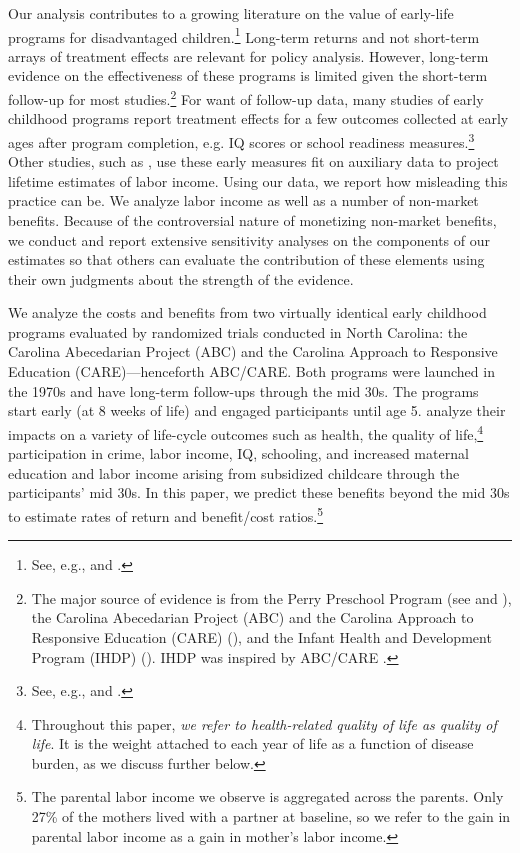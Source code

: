 Our analysis contributes to a growing literature on the value of early-life programs for disadvantaged children.\footnote{See, e.g., \cite{Currie_2011_AER} and \cite{Elango_Hojman_etal_2016_Early-Edu}.} Long-term returns and not short-term arrays of treatment effects are relevant for policy analysis. However, long-term evidence on the effectiveness of these programs is limited given the short-term follow-up for most studies.\footnote{The major source of evidence is from the Perry Preschool Program (see \citealp{Schweinhart_Montie_ea_2005_BOOKlifetime} and \citealp{Heckman_Moon_etal_2010_QE,Heckman_Moon_etal_2010_RateofReturn}), the Carolina Abecedarian Project (ABC) and the Carolina Approach to Responsive Education (CARE) (\citealp{Ramey_Campbell_etal_2000_ADS,Ramey-etal_2012-ABC}), and the Infant Health and Development Program (IHDP) (\citealp{Gross_Spiker_etal_1997_BOOKHelpinglowbirth,Duncan_Sojourner_2013_JHR}). IHDP was inspired by ABC/CARE \citep[][]{Gross_Spiker_etal_1997_BOOKHelpinglowbirth}.} For want of follow-up data, many studies of early childhood programs report treatment effects for a few outcomes collected at early ages after program completion, e.g. IQ scores or school readiness measures.\footnote{See, e.g.,  \cite{Weiland_2013_CD_Impacts-of-Pre-K} and \cite{Kline_Walters_2016_QJE}.} Other studies, such as \citet{Kline_Walters_2016_QJE}, use these early measures fit on auxiliary data to project lifetime estimates of labor income. Using our data, we report how misleading this practice can be. We analyze labor income as well as a number of non-market benefits. Because of the controversial nature of monetizing non-market benefits, we conduct and report extensive sensitivity analyses on the components of our estimates so that others can evaluate the contribution of these elements using their own judgments about the strength of the evidence.

We analyze the costs and benefits from two virtually identical early childhood programs evaluated by randomized trials conducted in North Carolina: the Carolina Abecedarian Project (ABC) and the Carolina Approach to Responsive Education (CARE)---henceforth ABC/CARE. Both programs were launched in the 1970s and have long-term follow-ups through the mid 30s. The programs start early (at 8 weeks of life) and engaged participants until age 5. \cite{Garcia_Heckman_Ziff_2017_Gender-Diff_UNPUBLISHED} analyze their impacts on a variety of life-cycle outcomes such as health, the quality of life,\footnote{Throughout this paper, \textit{we refer to health-related quality of life as quality of life}. It is the weight attached to each year of life as a function of disease burden, as we discuss further below.} participation in crime, labor income, IQ, schooling, and increased maternal education and labor income arising from subsidized childcare through the participants' mid 30s. In this paper, we predict these benefits beyond the mid 30s to estimate rates of return and benefit/cost ratios.\footnote{The parental labor income we observe is aggregated across the parents. Only 27\% of the mothers lived with a partner at baseline, so we refer to the gain in parental labor income as a gain in mother's labor income.}

